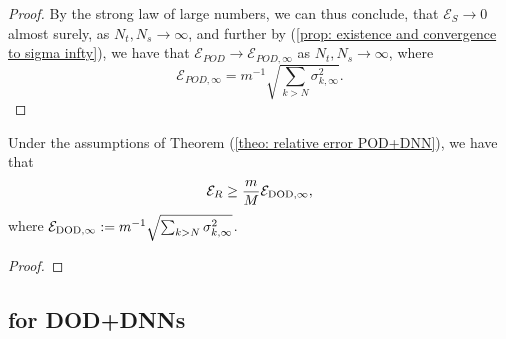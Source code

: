 \begin{proof}
    By the strong law of large numbers, we can thus conclude, that $\mathcal{E}_S \to 0$ almost surely, as $N_t, N_s \to \infty$, and further by (\ref{prop: existence and convergence to sigma infty}), we have that $\mathcal{E}_{POD} \to \mathcal{E}_{POD, \infty}$ as $N_t, N_s \to \infty$, where
    \begin{equation} \label{eq: pod eigenvalues cts case}
        \mathcal{E}_{POD, \infty} = m^{-1} \sqrt{\sum_{k > N} \sigma_{k, \infty}^2}.
    \end{equation}
\end{proof}

\begin{theorem} \label{theo: lower bound on relative error}
    Under the assumptions of Theorem (\ref{theo: relative error POD+DNN}), we have that 
    \begin{equation*}
        \mathcal{E}_R \geq \frac{m}{M} \mathcal{E}_{\text{DOD}, \infty},
    \end{equation*}
    where $\mathcal{E}_{\text{DOD}, \infty} := m^{-1} \sqrt{\sum_{k > N} \sigma_{k, \infty}^2}$.
\end{theorem}
\begin{proof}
\end{proof}

\subsection{for DOD+DNNs}


